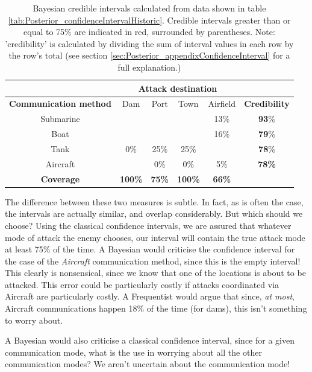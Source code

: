 \documentclass[11pt,fullpage]{book}
\begin{document}
\begin{table}[htbp]
  \centering
    \begin{tabular}{cccccc}
    \toprule
          & \multicolumn{4}{c}{\textbf{Attack destination}} &  \\
    \midrule
    \textbf{Communication method} & Dam & Port & Town & Airfield   & \textbf{Credibility} \\
    Submarine & \color{red}{$[$73\%}  & \color{red}{50\%}  & \color{red}{50\%$]$}  & 13\%  & \textbf{93}\% \\
    Boat  & \color{red}{$[$9\%}   & \color{red}{25\%}  & \color{red}{25\%$]$}  & 16\%  & \textbf{79}\% \\
    Tank  & 0\%   & 25\%  & 25\%  & \color{red}{$[$66\%$]$}  & \textbf{78}\% \\
    Aircraft & \color{red}{$[$18\%$]$}   & 0\%  & 0\%   & 5\%   &\textbf{78\%} \\
    \bottomrule
    \textbf{Coverage} & \textbf{100\%}  & \textbf{75\%} &\textbf{ 100\%}  & \textbf{66\%}  &  \\
    \end{tabular}%
   \caption{Bayesian credible intervals calculated from data shown in table \ref{tab:Posterior_confidenceIntervalHistoric}. Credible intervals greater than or equal to 75\% are indicated in red, surrounded by parentheses. Note: 'credibility' is calculated by dividing the sum of interval values in each row by the row's total (see section \ref{sec:Posterior_appendixConfidenceInterval} for a full explanation.)}\label{tab:Posterior_confidenceIntervalBayesian}%
\end{table}%

The difference between these two measures is subtle. In fact, as is often the case, the intervals are actually similar, and overlap considerably. But which should we choose? Using the classical confidence intervals, we are assured that whatever mode of attack the enemy chooses, our interval will contain the true attack mode at least 75\% of the time. A Bayesian would criticise the confidence interval for the case of the \textit{Aircraft} communication method, since this is the empty interval! This clearly is nonsensical, since we know that one of the locations is about to be attacked. This error could be particularly costly if attacks coordinated via Aircraft are particularly costly. A Frequentist would argue that since, \textit{at most}, Aircraft communications happen 18\% of the time (for dams), this isn't something to worry about.

A Bayesian would also criticise a classical confidence interval, since for a given communication mode, what is the use in worrying about all the other communication modes? We aren't uncertain about the communication mode!
\end{document}

